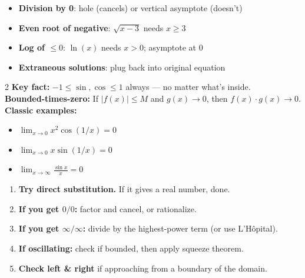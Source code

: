 \documentclass[11pt, letterpaper]{article}
\begin{document}
\begin{tcolorbox}[colback=part4bg, colframe=sectionorange,
  title={\bfseries Domain Red Flags}, arc=3pt, boxrule=1pt]
\footnotesize
\begin{itemize}[noitemsep, leftmargin=*]
  \item \textbf{Division by 0}: hole (cancels) or vertical asymptote (doesn't)
  \item \textbf{Even root of negative}: $\sqrt{x-3}$ needs $x \geq 3$
  \item \textbf{Log of $\leq 0$}: $\ln(x)$ needs $x > 0$; asymptote at $0$
  \item \textbf{Extraneous solutions}: plug back into original equation
\end{itemize}
\end{tcolorbox}

\vspace{4pt}

\begin{tcolorbox}[colback=partbg, colframe=sectionblue,
  title={\bfseries Squeezing Periodic Functions}, arc=3pt, boxrule=1pt]
\footnotesize
\begin{multicols}{2}
\textbf{Key fact:} $-1 \leq \sin, \cos \leq 1$ always --- no matter what's inside.\\[3pt]
\textbf{Bounded-times-zero:} \newline
If $|f(x)| \leq M$ and $g(x) \to 0$, \newline
then $f(x) \cdot g(x) \to 0$.
\columnbreak
\textbf{Classic examples:}
\begin{itemize}[noitemsep, leftmargin=*]
  \item $\lim_{x \to 0} x^2 \cos(1/x) = 0$
  \item $\lim_{x \to 0} x \sin(1/x) = 0$
  \item $\lim_{x \to \infty} \frac{\sin x}{x} = 0$
\end{itemize}
\end{multicols}
\end{tcolorbox}

\vspace{4pt}

\begin{tcolorbox}[colback=part6bg, colframe=sectionred,
  title={\bfseries Limits: Strategy}, arc=3pt, boxrule=1pt]
\footnotesize
\begin{enumerate}[noitemsep, leftmargin=*]
  \item \textbf{Try direct substitution.} If it gives a real number, done.
  \item \textbf{If you get $0/0$:} factor and cancel, or rationalize.
  \item \textbf{If you get $\infty/\infty$:} divide by the highest-power term (or use L'H\^opital).
  \item \textbf{If oscillating:} check if bounded, then apply squeeze theorem.
  \item \textbf{Check left \& right} if approaching from a boundary of the domain.
\end{enumerate}
\end{tcolorbox}
\end{document}
